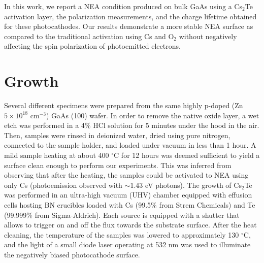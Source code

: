In this work, we report a NEA condition produced on bulk GaAs using a Cs$_2$Te activation layer, the polarization measurements, and the charge lifetime obtained for these photocathodes. Our results demonstrate a more stable NEA surface as compared to the traditional activation using Cs and O$_2$ without negatively affecting the spin polarization of photoemitted electrons.

\section{Growth}
Several different specimens were prepared from the same highly p-doped (Zn $5\times10^{18}$ cm$^{-3}$) GaAs (100) wafer.
In order to remove the native oxide layer, a wet etch was performed in a 4\% HCl solution for 5 minutes under the hood in the air. Then, samples were rinsed in deionized water, dried using pure nitrogen, connected to the sample holder, and loaded under vacuum in less than 1 hour. A mild sample heating at about 400 $^\circ$C for 12 hours was deemed sufficient to yield a surface clean enough to perform our experiments. This was inferred from observing that after the heating, the samples could be activated to NEA using only Cs (photoemission observed with $\sim$1.43 eV photons). 
The growth of Cs$_2$Te was performed in an ultra-high vacuum (UHV) chamber equipped with effusion cells hosting BN crucibles loaded with Cs (99.5\% from Strem Chemicals) and Te (99.999\% from Sigma-Aldrich). Each source is equipped with a shutter that allows to trigger on and off the flux towards the substrate surface. After the heat cleaning, the temperature of the samples was lowered to approximately 130 $^\circ$C, and the light of a small diode laser operating at 532 nm was used to illuminate the negatively biased photocathode surface.
